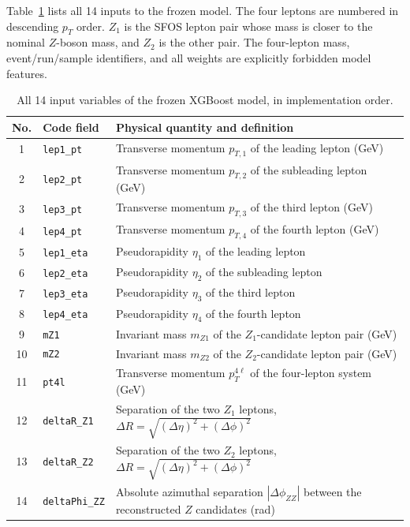 \documentclass[11pt,a4paper]{article}
\begin{document}
Table~\ref{tab:model-features} lists all 14 inputs to the frozen model. The four leptons are numbered in descending $p_T$ order. $Z_1$ is the SFOS lepton pair whose mass is closer to the nominal $Z$-boson mass, and $Z_2$ is the other pair. The four-lepton mass, event/run/sample identifiers, and all weights are explicitly forbidden model features.

\begin{table}[H]
\centering
\caption{All 14 input variables of the frozen XGBoost model, in implementation order.}
\label{tab:model-features}
\small
\begin{tabularx}{\textwidth}{@{}clX@{}}
\toprule
No. & Code field & Physical quantity and definition \\
\midrule
1  & \texttt{lep1\_pt}      & Transverse momentum $p_{T,1}$ of the leading lepton (GeV) \\
2  & \texttt{lep2\_pt}      & Transverse momentum $p_{T,2}$ of the subleading lepton (GeV) \\
3  & \texttt{lep3\_pt}      & Transverse momentum $p_{T,3}$ of the third lepton (GeV) \\
4  & \texttt{lep4\_pt}      & Transverse momentum $p_{T,4}$ of the fourth lepton (GeV) \\
5  & \texttt{lep1\_eta}     & Pseudorapidity $\eta_1$ of the leading lepton \\
6  & \texttt{lep2\_eta}     & Pseudorapidity $\eta_2$ of the subleading lepton \\
7  & \texttt{lep3\_eta}     & Pseudorapidity $\eta_3$ of the third lepton \\
8  & \texttt{lep4\_eta}     & Pseudorapidity $\eta_4$ of the fourth lepton \\
9  & \texttt{mZ1}           & Invariant mass $m_{Z1}$ of the $Z_1$-candidate lepton pair (GeV) \\
10 & \texttt{mZ2}           & Invariant mass $m_{Z2}$ of the $Z_2$-candidate lepton pair (GeV) \\
11 & \texttt{pt4l}          & Transverse momentum $p_T^{4\ell}$ of the four-lepton system (GeV) \\
12 & \texttt{deltaR\_Z1}    & Separation of the two $Z_1$ leptons, $\Delta R=\sqrt{(\Delta\eta)^2+(\Delta\phi)^2}$ \\
13 & \texttt{deltaR\_Z2}    & Separation of the two $Z_2$ leptons, $\Delta R=\sqrt{(\Delta\eta)^2+(\Delta\phi)^2}$ \\
14 & \texttt{deltaPhi\_ZZ}  & Absolute azimuthal separation $|\Delta\phi_{ZZ}|$ between the reconstructed $Z$ candidates (rad) \\
\bottomrule
\end{tabularx}
\end{table}
\end{document}
